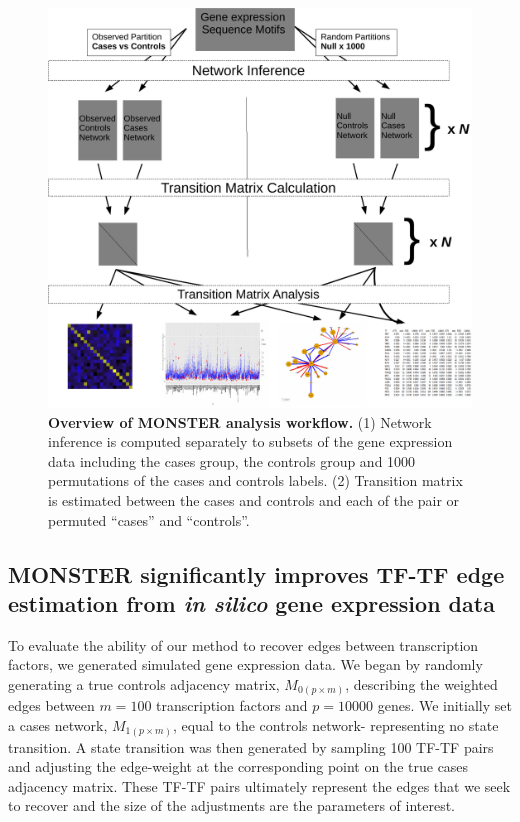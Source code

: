 \documentclass[9pt,twocolumn,twoside]{pnas-new}
\begin{document}
\begin{figure}
\centering{}\includegraphics[width=1\columnwidth]{figures/workflow_diagram}\caption{\textbf{Overview of MONSTER analysis workflow.} (1) Network inference
is computed separately to subsets of the gene expression data including
the cases group, the controls group and 1000 permutations of the cases
and controls labels. (2) Transition matrix is estimated between the
cases and controls and each of the pair or permuted ``cases'' and
``controls''.}
\end{figure}


\subsection*{MONSTER significantly improves TF-TF edge estimation from \emph{in silico} gene expression data} 

To evaluate the ability of our method to recover edges between transcription
factors, we generated simulated gene expression data. We began by randomly generating a true controls adjacency matrix, $M_{0\left(p\times m\right)}$, 
describing the weighted edges between $m=100$ transcription factors and
$p=10000$ genes.  We initially set a cases network, $M_{1\left(p\times m\right)}$, equal to the controls network- representing no state transition. A state transition was then generated by sampling 100 TF-TF
pairs and adjusting the edge-weight at the corresponding point on
the true cases adjacency matrix. These
TF-TF pairs ultimately represent the edges that we seek to recover
and the size of the adjustments are the parameters of interest.
\end{document}
